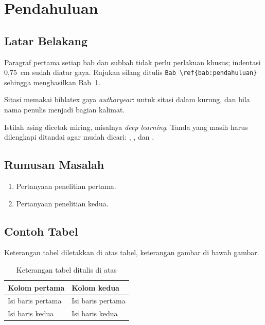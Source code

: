 \chapter{Pendahuluan}\label{bab:pendahuluan}

\section{Latar Belakang}\label{sec:latar-belakang}

Paragraf pertama setiap bab dan subbab tidak perlu perlakuan khusus; indentasi 0,75~cm
sudah diatur gaya. Rujukan silang ditulis \texttt{Bab~\textbackslash ref\{bab:pendahuluan\}}
sehingga menghasilkan Bab~\ref{bab:pendahuluan}.

Sitasi memakai biblatex gaya \emph{authoryear}: \parencite{contoh2020} untuk sitasi dalam
kurung, dan \textcite{contoh2020} bila nama penulis menjadi bagian kalimat.

Istilah asing dicetak miring, misalnya \textit{deep learning}. Tanda yang masih harus
dilengkapi ditandai agar mudah dicari: ,
, dan .

\section{Rumusan Masalah}\label{sec:rumusan-masalah}

\begin{enumerate}[label=RM\arabic*.,leftmargin=1.2cm,labelwidth=1.2cm]
  \item Pertanyaan penelitian pertama.
  \item Pertanyaan penelitian kedua.
\end{enumerate}

\section{Contoh Tabel}\label{sec:contoh-tabel}

Keterangan tabel diletakkan di atas tabel, keterangan gambar di bawah gambar.

\begin{table}[H]
  \centering
  \caption{Keterangan tabel ditulis di atas}
  \label{tab:contoh}
  \begin{tabular}{|l|l|}
    \hline
    \textbf{Kolom pertama} & \textbf{Kolom kedua} \\ \hline
    Isi baris pertama      & Isi baris pertama    \\ \hline
    Isi baris kedua        & Isi baris kedua      \\ \hline
  \end{tabular}
\end{table}

